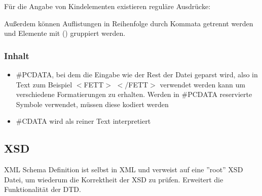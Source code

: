 \documentclass[12pt,a4]{article}
\begin{document}
 Für die Angabe von Kindelementen existieren reguläre Ausdrücke:

Außerdem können Auflistungen in Reihenfolge durch Kommata getrennt werden und Elemente mit () gruppiert werden.
\subsubsection{Inhalt}
\begin{itemize}
	\item \#PCDATA, bei dem die Eingabe wie der Rest der Datei geparst wird, also in Text zum Beispiel \(<\)FETT\(>\) \(<\)/FETT\(>\) verwendet werden kann um verschiedene Formatierungen zu erhalten. Werden in \#PCDATA reservierte Symbole verwendet, müssen diese kodiert werden
	\item \#CDATA wird als reiner Text interpretiert
\end{itemize}
 
 
\subsection{XSD}
XML Schema Definition ist selbst in XML und verweist auf eine ''root'' XSD Datei, um wiederum die Korrektheit der XSD zu prüfen. Erweitert die Funktionalität der DTD.
	
	
	
	
	
	
	
\end{document}
